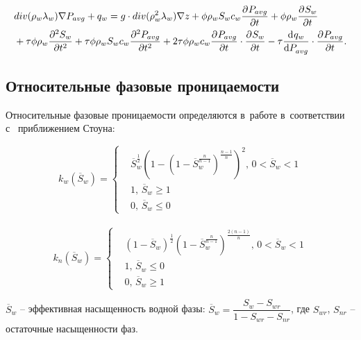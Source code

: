 \begin{equation} \label{eq:mod_saturation}
 \begin{aligned}
  & div (\rho_w\lambda_w) \nabla P_{avg} + q_w = g \cdot div (\rho_w^2\lambda_w) \nabla z + \phi \rho_w S_w c_w  \pd{P_{avg}}{t}
  + \phi \rho_w \pd{S_w}{t} \\
  & + \tau \phi \rho_w \pd[2]{S_w}{t} + \tau \phi \rho_w S_w c_w \pd[2]{P_{avg}}{t}
  + 2 \tau \phi \rho_w c_w \pd{P_{avg}}{t} \cdot \pd{S_w}{t} - \tau \dd{q_w}{P_{avg}} \cdot \pd{P_{avg}}{t}.
 \end{aligned}
\end{equation}

\subsection{Относительные фазовые проницаемости}
Относительные фазовые проницаемости определяются в~работе в~соответствии с~
приближением Стоуна\cite{Aziz-Settari}:

\begin{equation*}
  k_{w}(\overline{S}_w)=
  \begin{cases}
  &\overline{S}_w^\frac{1}{2} \left( 1-\left( 1-\overline{S}_w^\frac{n}{n-1} \right) ^\frac{n-1}{n} \right) ^2,
  \, 0<\overline{S}_w<1 \\
  &1, \,\overline{S}_w\ge 1\\
  &0, \,\overline{S}_w\le 0
\end{cases} 
\end{equation*}
\\
\begin{equation*}
  k_{n}(\overline{S}_w)=
  \begin{cases}
  &(1-\overline{S}_w)^\frac{1}{2} \left(1-\overline{S}_w^\frac{n}{n-1} \right) ^\frac{2(n-1)}{n},
  \, 0<\overline{S}_w<1\\
  &1, \,\overline{S}_w\le 0\\
  &0, \, \overline{S}_w\ge 1
  \end{cases}
\end{equation*}

$\overline{S}_w$ -- эффективная насыщенность водной фазы:
$\overline{S}_w={\dfrac{S_w-S_{wr}}{1-S_{wr}-S_{nr}}}$, где $S_{wr}$,
$S_{nr}$ -- остаточные насыщенности фаз.